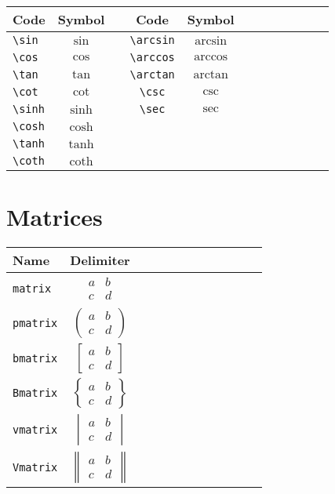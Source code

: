 \documentclass{article}
\begin{document}
\begin{tabular}{l*{10}{c}r}
	Code & Symbol & \vline & Code & Symbol \\
	\hline
	\verb|\sin| & $\sin$ & \vline & \verb|\arcsin| & $\arcsin$ \\
	\verb|\cos| & $\cos$ & \vline & \verb|\arccos| & $\arccos$ \\
	\verb|\tan| & $\tan$ & \vline & \verb|\arctan| & $\arctan$ \\
	\verb|\cot| & $\cot$ & \vline & \verb|\csc| & $\csc$ \\
	\verb|\sinh| & $\sinh$ & \vline & \verb|\sec| & $\sec$ \\
	\verb|\cosh| & $\cosh$ & \vline & & \\
	\verb|\tanh| & $\tanh$ & \vline & & \\
	\verb|\coth| & $\coth$ & \vline & &
\end{tabular}

\section{Matrices}

\begin{tabular}{l*{10}{c}r}
	Name & Delimiter \\
	\hline
	\verb|matrix| & $\begin{matrix}a & b\\ c & d\end{matrix}$ \vspace{1mm} \\
	\verb|pmatrix| & $\begin{pmatrix}a & b\\ c & d\end{pmatrix}$ \vspace{1mm} \\
	\verb|bmatrix| & $\begin{bmatrix}a & b\\ c & d\end{bmatrix}$ \vspace{1mm} \\
	\verb|Bmatrix| & $\begin{Bmatrix}a & b\\ c & d\end{Bmatrix}$ \vspace{1mm} \\
	\verb|vmatrix| & $\begin{vmatrix}a & b\\ c & d\end{vmatrix}$ \vspace{1mm} \\
	\verb|Vmatrix| & $\begin{Vmatrix}a & b\\ c & d\end{Vmatrix}$
\end{tabular}
\end{document}
